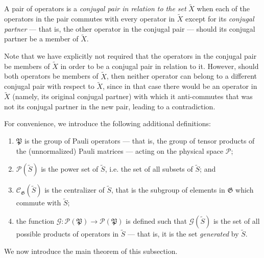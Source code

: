 \documentclass[twocolumn,showpacs,preprintnumbers,amsmath,amssymb,nofootinbib,pra,floatfix]{revtex4-1}
\newenvironment{definition}[1][Definition]{\begin{trivlist}
\item[\hskip \labelsep {\bfseries #1}]}{\end{trivlist}}
\newcommand{\set}{\tilde}
\newcommand{\genfun}{\mathcal{G}}
\newcommand{\pauligroup}{\mathfrak{P}}
\newcommand{\powerset}{\mathcal{P}}
\newcommand{\centralizer}{\mathcal{C}}
\begin{document}
\begin{definition} A pair of operators is a \emph{conjugal pair in relation to the set} $\set X$ when each of the operators in the pair commutes with every operator in $\set X$ except for its \emph{conjugal partner} --- that is, the other operator in the conjugal pair --- should its conjugal partner be a member of $\set X$.
\label{conjugal-pair-definition}
\end{definition}

Note that we have explicitly not required that the operators in the conjugal pair be members of $\set X$ in order to be a conjugal pair in relation to it.  However, should both operators be members of $\set X$, then neither operator can belong to a different conjugal pair with respect to $\set X$, since in that case there would be an operator in $\set X$ (namely, its original conjugal partner) with which it anti-commutes that was not its conjugal partner in the new pair, leading to a contradiction.

For convenience, we introduce the following additional definitions:

\begin{definition}

\begin{enumerate}
\item $\pauligroup$ is the group of Pauli operators --- that is, the group of tensor products of the (unnormalized) Pauli matrices --- acting on the physical space $\mathscr{P}$;
\item $\powerset(\set S)$ is the power set of $\set S$, i.e. the set of all subsets of $\set S$; and
\item $\centralizer_\mathfrak{G}(\set S)$ is the centralizer of $\set S$, that is the subgroup of elements in $\mathfrak{G}$ which commute with $\set S$;
\item the function $\genfun:\powerset(\pauligroup)\to\powerset(\pauligroup)$ is defined such that $\genfun(\set S)$ is the set of all possible products of operators in $\set S$ --- that is, it is the set \emph{generated} by $\set S$.
\end{enumerate}

\end{definition}

We now introduce the main theorem of this subsection.
\end{document}
